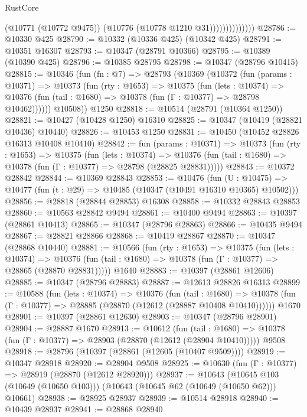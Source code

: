 \begin{lexlean}{RustCore}
\begin{coremodule}
                            (@10771 (@10772 @9475))
                            (@10776 (@10778 @1210 @31))))))))))))))
@28786 := @10330 @425
@28790 := @10332 (@10336 @425) (@10342 @425)
@28791 := @10351 @16307
@28793 := @10347 (@28791 @10366)
@28795 := @10389 (@10390 @425)
@28796 := @10385 @28795
@28798 := @10347 (@28796 @10415)
@28815 := @10346
    (fun (fn : @7) =>
    @28793
      (@10369
        (@10372
          (fun (params : @10371) =>
          @10373
            (fun (rty : @1653) =>
            @10375
              (fun (lets : @10374) =>
              @10376 (fun (tail : @1680) => @10378 (fun (Γ : @10377) => @28798 @10462))))))
        @10508))
    @1250
@28818 := @10514 (@28791 (@10364 @1250))
@28821 := @10427 (@10428 @1250) @16310
@28825 := @10347 (@10419 (@28821 @10436) @10440)
@28826 := @10453 @1250
@28831 := @10450 (@10452 @28826 @16313 @10408 @10410)
@28842 := fun (params : @10371) =>
  @10373
    (fun (rty : @1653) =>
    @10375
      (fun (lets : @10374) =>
      @10376 (fun (tail : @1680) => @10378 (fun (Γ : @10377) => @28798 (@28825 @28831)))))
@28843 := @10372 @28842
@28844 := @10369 @28843
@28853 := @10476
    (fun (U : @10475) => @10477 (fun (t : @29) => @10485 (@10347 (@10491 @16310 @10365) @10502)))
@28856 := @28818 (@28844 @28853) @16308
@28858 := @10332 @28843 @28853
@28860 := @10563 @28842 @9494
@28861 := @10400 @9494
@28863 := @10397 (@28861 @10413)
@28865 := @10347 (@28796 @28863)
@28866 := @10435 @9494
@28867 := @28821 @28866
@28868 := @10419 @28867
@28870 := @10347 (@28868 @10440)
@28881 := @10566
    (fun (rty : @1653) =>
    @10375
      (fun (lets : @10374) =>
      @10376 (fun (tail : @1680) => @10378 (fun (Γ : @10377) => @28865 (@28870 @28831)))))
    @1640
@28883 := @10397 (@28861 @12606)
@28885 := @10347 (@28796 @28883)
@28887 := @12613 @28826 @16313
@28899 := @10588
    (fun (lets : @10374) =>
    @10376
      (fun (tail : @1680) =>
      @10378 (fun (Γ : @10377) => @28885 (@28870 (@12612 (@28887 @10408 @10410))))))
    @1670
@28901 := @10397 (@28861 @12630)
@28903 := @10347 (@28796 @28901)
@28904 := @28887 @1670
@28913 := @10612
    (fun (tail : @1680) => @10378 (fun (Γ : @10377) => @28903 (@28870 (@12612 (@28904 @10410)))))
    @9508
@28918 := @28796 (@10397 (@28861 (@12605 (@10407 @9509))))
@28919 := @10347 @28918
@28920 := @28904 @9508
@28925 := @10630 (fun (Γ : @10377) => @28919 (@28870 (@12612 @28920)))
@28937 := @10643
    (@10645 @103 (@10649 (@10650 @103)))
    (@10643 (@10645 @62 (@10649 (@10650 @62))) @10661)
@28938 := @28925 @28937
@28939 := @10514 @28918
@28940 := @10439 @28937
@28941 := @28868 @28940

\end{coremodule}
\end{lexlean}

